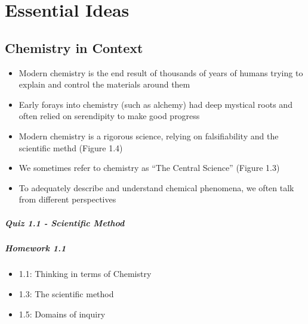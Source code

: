 \documentclass[12pt, openany, letterpaper]{memoir}
\begin{document}
\chapter{Essential Ideas}

\section{Chemistry in Context}
\begin{itemize}
  \item Modern chemistry is the end result of thousands of years of humans trying to explain and control the materials around them
  \item Early forays into chemistry (such as alchemy) had deep mystical roots and often relied on serendipity to make good progress
  \item Modern chemistry is a rigorous science, relying on falsifiability and the scientific methd (Figure 1.4)
  \item We sometimes refer to chemistry as ``The Central Science'' (Figure 1.3)
  \item To adequately describe and understand chemical phenomena, we often talk from different perspectives
\end{itemize}
\paragraph*{Quiz 1.1 - Scientific Method}
\paragraph*{Homework 1.1}
\begin{itemize}
  \item 1.1: Thinking in terms of Chemistry
  \item 1.3: The scientific method
  \item 1.5: Domains of inquiry
\end{itemize}
\end{document}
